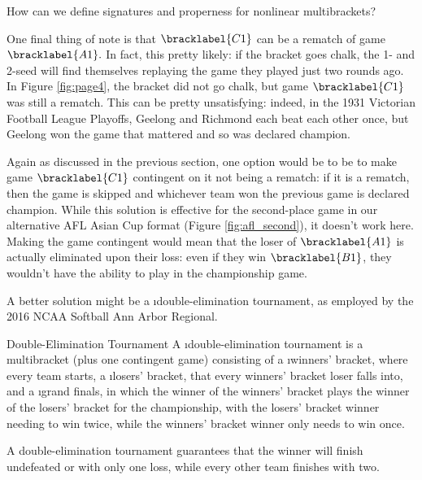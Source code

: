 {    \begin{oq}{}{}
        How can we define signatures and properness for nonlinear multibrackets?
    \end{oq}


    One final thing of note is that $\bracklabel{C1}$ can be a rematch of game $\bracklabel{A1}.$ In fact, this pretty likely: if the bracket goes chalk, the 1- and 2-seed will find themselves replaying the game they played just two rounds ago. In Figure \ref{fig:page4}, the bracket did not go chalk, but game $\bracklabel{C1}$ was still a rematch. 
    This can be pretty unsatisfying: indeed, in the 1931 Victorian Football League Playoffs, Geelong and Richmond each beat each other once, but Geelong won the game that mattered and so was declared champion. 
    
    Again as discussed in the previous section, one option would be to be to make game $\bracklabel{C1}$ contingent on it not being a rematch: if it is a rematch, then the game is skipped and whichever team won the previous game is declared champion. While this solution is effective for the second-place game in our alternative AFL Asian Cup format (Figure \ref{fig:afl_second}), it doesn't work here. Making the game contingent would mean that the loser of $\bracklabel{A1}$ is actually eliminated upon their loss: even if they win $\bracklabel{B1}$, they wouldn't have the ability to play in the championship game.

    A better solution might be a \i{double-elimination tournament}, as employed by the 2016 NCAA Softball Ann Arbor Regional.


    \begin{definition}{Double-Elimination Tournament}{}
        A \i{double-elimination} tournament is a multibracket (plus one contingent game) consisting of a \i{winners' bracket}, where every team starts, a \i{losers'} bracket, that every winners' bracket loser falls into, and a \i{grand finals}, in which the winner of the winners' bracket plays the winner of the losers' bracket for the championship, with the losers' bracket winner needing to win twice, while the winners' bracket winner only needs to win once. 
    \end{definition}

    A double-elimination tournament guarantees that the winner will finish undefeated or with only one loss, while every other team finishes with two.

}

